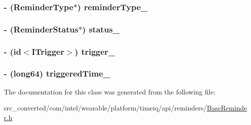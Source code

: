 \subsubsection[{reminder\+Type\+\_\+}]{\setlength{\rightskip}{0pt plus 5cm}-\/ ({\bf Reminder\+Type}$\ast$) reminder\+Type\+\_\+}\label{interface_base_reminder___base_reminder_builder_ab746ea93eff70976fd010b83000a5b27}
\hypertarget{interface_base_reminder___base_reminder_builder_a0f53a1b3433dc53d8d446e3ac2b4e78e}{}
\subsubsection[{status\+\_\+}]{\setlength{\rightskip}{0pt plus 5cm}-\/ ({\bf Reminder\+Status}$\ast$) status\+\_\+}\label{interface_base_reminder___base_reminder_builder_a0f53a1b3433dc53d8d446e3ac2b4e78e}
\hypertarget{interface_base_reminder___base_reminder_builder_ae7af533ae218464c28a3b1604908efc8}{}
\subsubsection[{trigger\+\_\+}]{\setlength{\rightskip}{0pt plus 5cm}-\/ (id$<${\bf I\+Trigger}$>$) trigger\+\_\+}\label{interface_base_reminder___base_reminder_builder_ae7af533ae218464c28a3b1604908efc8}
\hypertarget{interface_base_reminder___base_reminder_builder_a01f241c3f7ad8f5f8b7d3b4262a9b273}{}
\subsubsection[{triggered\+Time\+\_\+}]{\setlength{\rightskip}{0pt plus 5cm}-\/ (long64) triggered\+Time\+\_\+}\label{interface_base_reminder___base_reminder_builder_a01f241c3f7ad8f5f8b7d3b4262a9b273}


The documentation for this class was generated from the following file\+:\begin{DoxyCompactItemize}
\item 
src\+\_\+converted/com/intel/wearable/platform/timeiq/api/reminders/\hyperlink{_base_reminder_8h}{Base\+Reminder.\+h}\end{DoxyCompactItemize}
